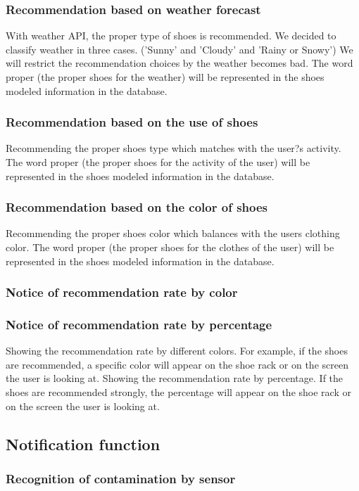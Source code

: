 \documentclass[conference]{IEEEtran}
\begin{document}
\subsubsection{Recommendation based on weather forecast }
With weather API, the proper type of shoes is recommended. We decided to classify weather in three cases. ('Sunny' and 'Cloudy' and 'Rainy or Snowy') We will restrict the recommendation choices by the weather becomes bad. The word proper (the proper shoes for the weather) will be represented in the shoes modeled information in the database.

\subsubsection{ Recommendation based on the use of shoes}
Recommending the proper shoes type which matches with the user?s activity. The word proper (the proper shoes for the activity of the user) will be represented in the shoes modeled information in the database.

\subsubsection{Recommendation based on the color of shoes}
Recommending the proper shoes color which balances with the users clothing color. The word proper (the proper shoes for the clothes of the user) will be represented in the shoes modeled information in the database.

\subsubsection{ Notice of recommendation rate by color}
\subsubsection{Notice of recommendation rate by percentage}
Showing the recommendation rate by different colors. For example, if the shoes are recommended, a specific color will appear on the shoe rack or on the screen the user is looking at. 
Showing the recommendation rate by percentage. If the shoes are recommended strongly, the percentage will appear on the shoe rack or on the screen the user is looking at. 


\subsection{Notification function}
\subsubsection{Recognition of contamination by sensor}
\end{document}
